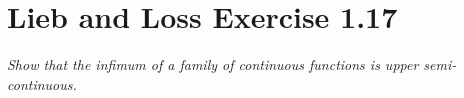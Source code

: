 \documentclass[12pt]{article}
\theoremstyle{plain}
\begin{document}
\begin{enumerate}[(i)]
\end{enumerate}

\section*{Lieb and Loss Exercise 1.17}
\emph{Show that the infimum of a family of continuous functions is upper semi-continuous.} \\
\end{document}
